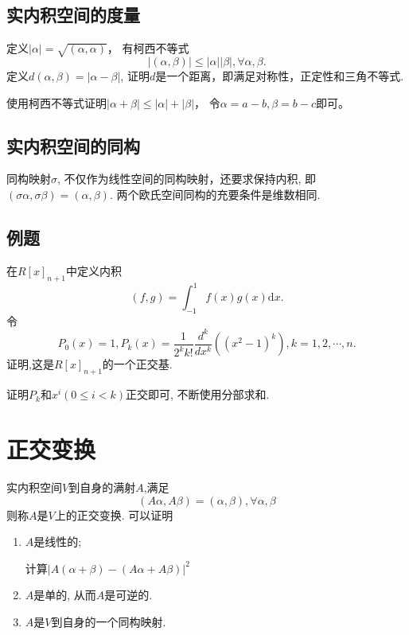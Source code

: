 \subsection{实内积空间的度量}
定义$|\alpha| = \sqrt{(\alpha, \alpha)}$，
有柯西不等式
$$|(\alpha,\beta)| \le |\alpha| |\beta|, \forall \alpha, \beta.$$
定义$d(\alpha, \beta) = |\alpha - \beta|$,
证明$d$是一个距离，即满足对称性，正定性和三角不等式.

\begin{solution}
    使用柯西不等式证明$|\alpha + \beta| \le |\alpha| + |\beta|$，
    令$\alpha = a - b, \beta = b - c$即可。
\end{solution}

\subsection{实内积空间的同构}
同构映射$\sigma$, 不仅作为线性空间的同构映射，还要求保持内积, 即
$(\sigma \alpha, \sigma \beta) = (\alpha, \beta)$.
两个欧氏空间同构的充要条件是维数相同.

\subsection{例题}
在$R[x]_{n+1}$中定义内积
$$(f,g) = \int^{1}_{-1}f(x)g(x) \mathrm{d}x.$$
令
$$P_0(x) = 1, P_k(x) = \frac{1}{2^k k!} \frac{d^k}{dx^k} ((x^2-1)^k), k = 1,2,\cdots,n.$$
证明,这是$R[x]_{n+1}$的一个正交基.

\begin{solution}
    证明$P_k$和$x^i(0\le i < k)$正交即可, 不断使用分部求和.
\end{solution}

\section{正交变换}
实内积空间$V$到自身的满射$A$,满足
$$(A\alpha, A\beta) = (\alpha, \beta), \forall \alpha, \beta$$
则称$A$是$V$上的正交变换.
可以证明
\begin{enumerate}
\item $A$是线性的;

\begin{solution}
    计算$|A(\alpha + \beta) - (A\alpha + A\beta)|^2$
\end{solution}
\item $A$是单的, 从而$A$是可逆的.
\item $A$是$V$到自身的一个同构映射.
\end{enumerate}

